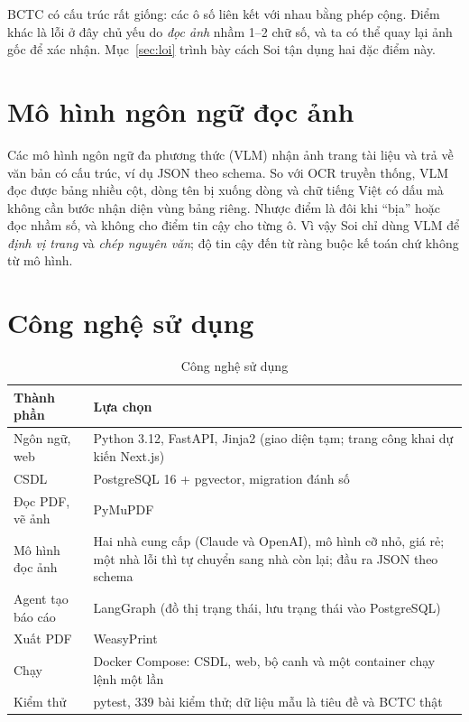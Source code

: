 \documentclass[12pt,a4paper]{report}
\newcommand{\enquote}[1]{“#1”}
\begin{document}
BCTC có cấu trúc rất giống: các ô số liên kết với nhau bằng phép cộng. Điểm khác là lỗi ở đây chủ yếu do \emph{đọc ảnh}
nhầm 1--2 chữ số, và ta có thể quay lại ảnh gốc để xác nhận. Mục~\ref{sec:loi} trình bày cách Soi tận dụng hai đặc điểm
này.

\section{Mô hình ngôn ngữ đọc ảnh}
Các mô hình ngôn ngữ đa phương thức (VLM) nhận ảnh trang tài liệu và trả về văn bản có cấu trúc, ví dụ JSON theo schema.
So với OCR truyền thống, VLM đọc được bảng nhiều cột, dòng tên bị xuống dòng và chữ tiếng Việt có dấu mà không cần bước
nhận diện vùng bảng riêng. Nhược điểm là đôi khi \enquote{bịa} hoặc đọc nhầm số, và không cho điểm tin cậy cho từng ô.
Vì vậy Soi chỉ dùng VLM để \emph{định vị trang} và \emph{chép nguyên văn}; độ tin cậy đến từ ràng buộc kế toán chứ không
từ mô hình.

\section{Công nghệ sử dụng}
\begin{table}[H]
\centering\small
\caption{Công nghệ sử dụng}\label{tab:congnghe}
\begin{tabularx}{\linewidth}{@{}lX@{}}
\toprule
\textbf{Thành phần} & \textbf{Lựa chọn} \\ \midrule
Ngôn ngữ, web & Python 3.12, FastAPI, Jinja2 (giao diện tạm; trang công khai dự kiến Next.js) \\
CSDL & PostgreSQL 16 + pgvector, migration đánh số \\
Đọc PDF, vẽ ảnh & PyMuPDF \\
Mô hình đọc ảnh & Hai nhà cung cấp (Claude và OpenAI), mô hình cỡ nhỏ, giá rẻ; một nhà lỗi thì tự chuyển sang nhà
còn lại; đầu ra JSON theo schema \\
Agent tạo báo cáo & LangGraph (đồ thị trạng thái, lưu trạng thái vào PostgreSQL) \\
Xuất PDF & WeasyPrint \\
Chạy & Docker Compose: CSDL, web, bộ canh và một container chạy lệnh một lần \\
Kiểm thử & pytest, 339 bài kiểm thử; dữ liệu mẫu là tiêu đề và BCTC thật \\
\bottomrule
\end{tabularx}
\end{table}

\end{document}
